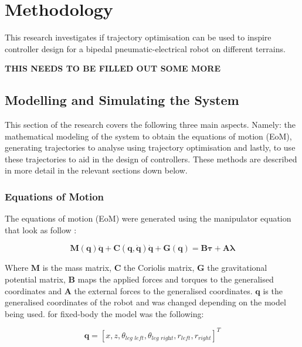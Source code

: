 \chapter{Methodology}
This research investigates if trajectory optimisation can be used to inspire controller design for a bipedal pneumatic-electrical robot on different terrains. 

\textbf{THIS NEEDS TO BE FILLED OUT SOME MORE}

\section{Modelling and Simulating the System} \label{model}
This section of the research covers the following three main aspects. Namely: the mathematical modeling of the system to obtain the equations of motion (EoM), generating trajectories to analyse using trajectory optimisation and lastly, to use these trajectories to aid in the design of controllers. These methods are described in more detail in the relevant sections down below.

    \subsection{Equations of Motion} \label{dynamics}
    The equations of motion (EoM) were generated using the manipulator equation that look as follow \cite{Robotics-2010, Underactuated-2022}:
    
    \begin{equation} \label{eq:eom}
        \bm{M}(\bm{q})\ddot{\bm{q}} + \bm{C}(\bm{q},\dot{\bm{q}})\dot{\bm{q}} + \bm{G}(\bm{q}) = \bm{B}\bm{\tau} + \bm{A}\bm{\lambda}
    \end{equation}
    
    Where $\bm{M}$ is the mass matrix, $\bm{C}$ the Coriolis matrix, $\bm{G}$ the gravitational potential matrix, $\bm{B}$ maps the applied forces and torques to the generalised coordinates and $\bm{A}$ the external forces to the generalised coordinates. $\bm{q}$ is the generalised coordinates of the robot and was changed depending on the model being used. for fixed-body the model was the following:
    
    \begin{equation}
        \bm{q} = [x,z,\theta_{\textit{leg left}}, \theta_{\textit{leg right}}, r_{left}, r_{right}]^T
    \end{equation}
    
